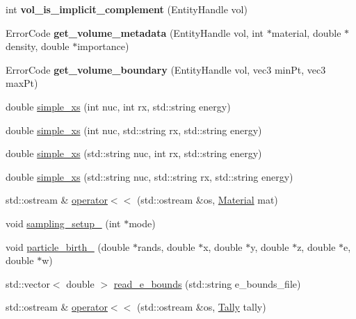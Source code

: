 \begin{DoxyCompactItemize}
\item 
int {\bfseries vol\+\_\+is\+\_\+implicit\+\_\+complement} (Entity\+Handle vol)\hypertarget{namespacepyne_ab3a6e65aa714fb05584dcbe5fb4e67c3}{}\label{namespacepyne_ab3a6e65aa714fb05584dcbe5fb4e67c3}

\item 
Error\+Code {\bfseries get\+\_\+volume\+\_\+metadata} (Entity\+Handle vol, int $\ast$material, double $\ast$density, double $\ast$importance)\hypertarget{namespacepyne_a0068d2c04f0b12f020479176ded0ca99}{}\label{namespacepyne_a0068d2c04f0b12f020479176ded0ca99}

\item 
Error\+Code {\bfseries get\+\_\+volume\+\_\+boundary} (Entity\+Handle vol, vec3 min\+Pt, vec3 max\+Pt)\hypertarget{namespacepyne_a41c879e6c635870307ab2a999e588429}{}\label{namespacepyne_a41c879e6c635870307ab2a999e588429}

\item 
double \hyperlink{namespacepyne_abde9d0cbfe70fd1a75a7cb2d1f59e1f1}{simple\+\_\+xs} (int nuc, int rx, std\+::string energy)
\item 
double \hyperlink{namespacepyne_ab10ec6870a2330af652b07b4dc6dcb27}{simple\+\_\+xs} (int nuc, std\+::string rx, std\+::string energy)
\item 
double \hyperlink{namespacepyne_a5175275a09e97886dcf15a082a719812}{simple\+\_\+xs} (std\+::string nuc, int rx, std\+::string energy)
\item 
double \hyperlink{namespacepyne_ac9f173d7792a84eb558dc7396c7d4d56}{simple\+\_\+xs} (std\+::string nuc, std\+::string rx, std\+::string energy)
\item 
std\+::ostream \& \hyperlink{namespacepyne_a1241699bbd3224bb066190b7778dbd82}{operator$<$$<$} (std\+::ostream \&os, \hyperlink{classpyne_1_1_material}{Material} mat)
\item 
void \hyperlink{namespacepyne_a4b568e0d7793942733d5403116ddc00f}{sampling\+\_\+setup\+\_\+} (int $\ast$mode)
\item 
void \hyperlink{namespacepyne_ab6600e28064496661683a9c6ac4d5ec5}{particle\+\_\+birth\+\_\+} (double $\ast$rands, double $\ast$x, double $\ast$y, double $\ast$z, double $\ast$e, double $\ast$w)
\item 
std\+::vector$<$ double $>$ \hyperlink{namespacepyne_ab3863857f230598b1f05504671c2bafc}{read\+\_\+e\+\_\+bounds} (std\+::string e\+\_\+bounds\+\_\+file)
\item 
std\+::ostream \& \hyperlink{namespacepyne_a6cd92dc1f5fb7e90e3d65c41b0b41f3c}{operator$<$$<$} (std\+::ostream \&os, \hyperlink{classpyne_1_1_tally}{Tally} tally)\hypertarget{namespacepyne_a6cd92dc1f5fb7e90e3d65c41b0b41f3c}{}\label{namespacepyne_a6cd92dc1f5fb7e90e3d65c41b0b41f3c}


\end{DoxyCompactItemize}
